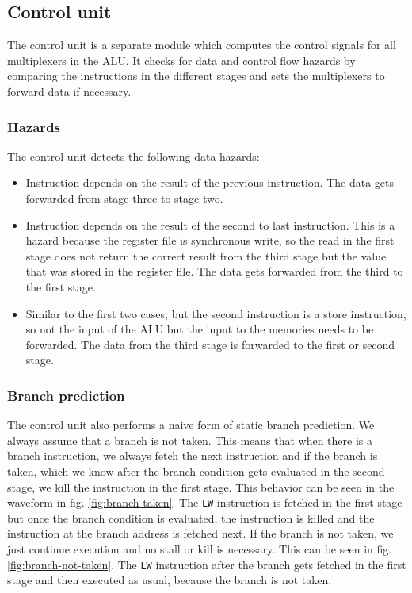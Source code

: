 \documentclass[12pt]{article}
\begin{document}
\subsection{Control unit}
\label{sub:control-unit}
The control unit is a separate module which computes the control signals for all multiplexers in the ALU. It checks for data and control flow hazards by comparing the instructions in the different stages and sets the multiplexers to forward data if necessary.
\subsubsection{Hazards}
The control unit detects the following data hazards:
\begin{itemize}
\item Instruction depends on the result of the previous instruction. The data gets forwarded from stage three to stage two.
\item Instruction depends on the result of the second to last instruction. This is a hazard because the register file is synchronous write, so the read in the first stage does not return the correct result from the third stage but the value that was stored in the register file. The data gets forwarded from the third to the first stage.
\item Similar to the first two cases, but the second instruction is a store instruction, so not the input of the ALU but the input to the memories needs to be forwarded. The data from the third stage is forwarded to the first or second stage.
\end{itemize}


\subsubsection{Branch prediction}
The control unit also performs a naive form of static branch prediction. We always assume that a branch is not taken. This means that when there is a branch instruction, we always fetch the next instruction and if the branch is taken, which we know after the branch condition gets evaluated in the second stage, we kill the instruction in the first stage. This behavior can be seen in the waveform in fig. \ref{fig:branch-taken}. The \texttt{LW} instruction is fetched in the first stage but once the branch condition is evaluated, the instruction is killed and the instruction at the branch address is fetched next. If the branch is not taken, we just continue execution and no stall or kill is necessary. This can be seen in fig. \ref{fig:branch-not-taken}. The \texttt{LW} instruction after the branch gets fetched in the first stage and then executed as usual, because the branch is not taken.
\end{document}
